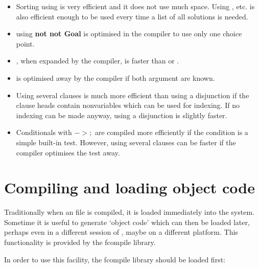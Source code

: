 \begin{itemize}
\item Sorting using  is very efficient and it does not use
much space.
Using ,  etc. is also efficient enough
to be used every time a list of all solutions is needed.

\item using {\bf not not Goal} is optimised in the compiler
to use only one choice point.

\item {}, when expanded by the compiler, is faster than 
or .

\item {} is optimised away by the compiler
if both argument are known.

\item Using several clauses is much more efficient than using
a disjunction if the clause heads contain nonvariables
which can be used for indexing.
If no indexing can be made anyway, using a disjunction
is slightly faster.

\item Conditionals with {\bf $-> ;$} are compiled more efficiently
if the condition is a simple built-in test.
However, using several clauses can be faster if the compiler
optimises the test away.

\end{itemize}

\section{Compiling and loading object code}
\label{fcompile}

Traditionally when an {\eclipse} file is compiled, it is loaded immediately
into the system. Sometime it is useful to generate `object code' which can
then be loaded later, perhaps even in a different session of \eclipse,
maybe on a different platform. This functionality is provided by the
fcompile library.

In order to use this facility, the fcompile library should be loaded first:

